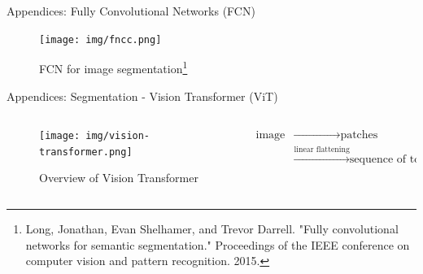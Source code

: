 \begin{frame}{Appendices: Fully Convolutional Networks (FCN)}
    \begin{figure}
        \centering
        \texttt{[image: img/fncc.png]}
        \caption{FCN for image segmentation\footnote{Long, Jonathan, Evan Shelhamer, and Trevor Darrell. "Fully convolutional networks for semantic segmentation." Proceedings of the IEEE conference on computer vision and pattern recognition. 2015.}}
        \label{fig:enter-label}
    \end{figure}
\end{frame}

\begin{frame}{Appendices: Segmentation - Vision Transformer (ViT)}
\begin{columns}
    \begin{column}{0.6\textwidth}
        \begin{figure}
            \centering
            \texttt{[image: img/vision-transformer.png]}
            \caption{Overview of Vision Transformer\footnotemark}
        \end{figure}
    \end{column}
    \begin{column}{0.4\textwidth}
        \begin{align*}
            \text{image}&\xrightarrow{\,\,\,\,\,\,\,\,\,\,\,\,\,\,\,\,\,\,\,\,\,\,\,\,\,\,\,\,\,\,\,\,\,\,\,} \text{patches}\\
                        &\xrightarrow{\text{linear flattening}} \text{sequence of tokens}
        \end{align*}
    \end{column}
\end{columns}
\end{frame}

